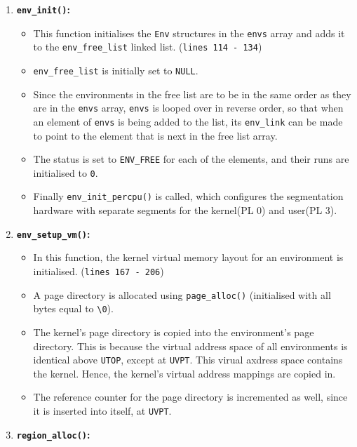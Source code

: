 \documentclass[]{article}
\begin{document}
\begin{enumerate}
\def\labelenumi{\arabic{enumi}.}
\itemsep1pt\parskip0pt
\item
  \textbf{\texttt{env\_init()}:}

  \begin{itemize}
  \itemsep1pt\parskip0pt
  \item
    This function initialises the \texttt{Env} structures in the
    \texttt{envs} array and adds it to the \texttt{env\_free\_list}
    linked list. (\texttt{lines 114 - 134})
  \item
    \texttt{env\_free\_list} is initially set to \texttt{NULL}.
  \item
    Since the environments in the free list are to be in the same order
    as they are in the \texttt{envs} array, \texttt{envs} is looped over
    in reverse order, so that when an element of \texttt{envs} is being
    added to the list, its \texttt{env\_link} can be made to point to
    the element that is next in the free list array.
  \item
    The status is set to \texttt{ENV\_FREE} for each of the elements,
    and their runs are initialised to \texttt{0}.
  \item
    Finally \texttt{env\_init\_percpu()} is called, which configures the
    segmentation hardware with separate segments for the kernel(PL 0)
    and user(PL 3).
  \end{itemize}
\item
  \textbf{\texttt{env\_setup\_vm()}:}

  \begin{itemize}
  \itemsep1pt\parskip0pt
  \item
    In this function, the kernel virtual memory layout for an
    environment is initialised. (\texttt{lines 167 - 206})
  \item
    A page directory is allocated using \texttt{page\_alloc()}
    (initialised with all bytes equal to \texttt{\textbackslash{}0}).
  \item
    The kernel's page directory is copied into the environment's page
    directory. This is because the virtual address space of all
    environments is identical above \texttt{UTOP}, except at
    \texttt{UVPT}. This virual axdress space contains the kernel. Hence,
    the kernel's virtual address mappings are copied in.
  \item
    The reference counter for the page directory is incremented as well,
    since it is inserted into itself, at \texttt{UVPT}.
  \end{itemize}
\item
  \textbf{\texttt{region\_alloc()}:}


\end{enumerate}
\end{document}
